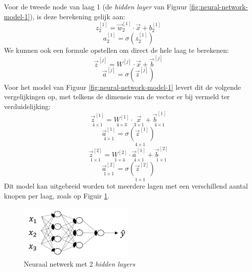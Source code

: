 \noindent
Voor de tweede node van laag 1 (de \textit{hidden layer} van Figuur \ref{fig:neural-network-model-1}), is deze berekening gelijk aan:
\begin{equation*}
	z_{2}^{[1]} = \vec{w}_{2}^{[1]} \cdot \vec{x} + b_{2}^{[1]}
\end{equation*}
\begin{equation*}
	a_{2}^{[1]} = \sigma(z_{2}^{[1]})
\end{equation*}
We kunnen ook een formule opstellen om direct de hele laag te berekenen:
\begin{equation}
	\vec{z}^{[j]} = W^{[j]} \cdot \vec{x} + \vec{b}^{[j]}
\end{equation}
\begin{equation}
	\vec{a}^{[j]} = \sigma(\vec{z}^{[j]})
\end{equation}
\noindent
Voor het model van Figuur \ref{fig:neural-network-model-1} levert dit de volgende vergelijkingen op, met telkens de dimensie van de vector er bij vermeld ter verduidelijking:
\begin{equation*}
	\underset{4\times1}{\vec{z}^{[1]}} = \underset{4\times3}{W^{[1]}} \cdot \underset{3\times1}{\vec{x}} + \underset{4\times1}{\vec{b}^{[1]}}
\end{equation*}
\begin{equation*}
	\underset{4\times1}{\vec{a}^{[1]}} = \underset{4\times1}{\sigma(\vec{z}^{[1]})}
\end{equation*}
\begin{equation*}
	\underset{1\times1}{\vec{z}^{[2]}} = \underset{1\times4}{W^{[2]}} \cdot \underset{4\times1}{\vec{a}^{[1]}} + \underset{1\times1}{\vec{b}^{[2]}}
\end{equation*}
\begin{equation*}
	\underset{1\times1}{\vec{a}^{[2]}} = \underset{1\times1}{\sigma(\vec{z}^{[2]}) }
\end{equation*}
\noindent
Dit model kan uitgebreid worden tot meerdere lagen met een verschillend aantal knopen per laag, zoals op Figuir \ref{fig:neural-network-model-2}.
\begin{figure}[h]
	\centering
	\includegraphics[width=0.5\textwidth]{images/15-neural-network-model-2.png}
	\caption{Neuraal netwerk met 2 \textit{hidden layers}}
	\label{fig:neural-network-model-2}
\end{figure}

